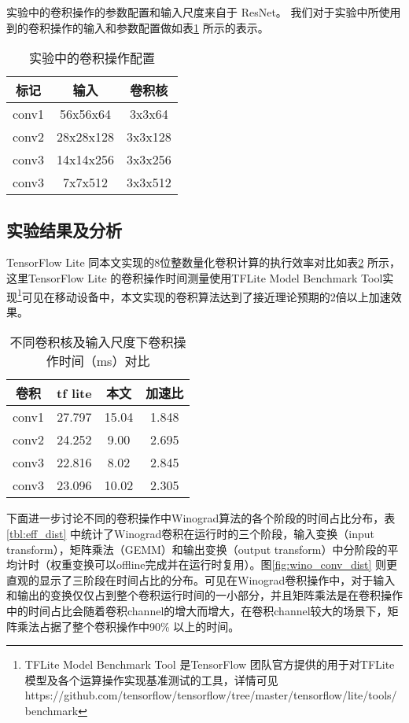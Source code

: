 实验中的卷积操作的参数配置和输入尺度来自于 ResNet\cite{He2016DeepRL}。
我们对于实验中所使用到的卷积操作的输入和参数配置做如表\ref{tbl:conv_repr} 所示的表示。

\begin{table}[]
\centering
\caption{实验中的卷积操作配置}
\begin{tabular}{ccc}
  \toprule
  标记    & 输入     & 卷积核  \\
  \midrule
  conv1   & 56x56x64  & 3x3x64  \\
  conv2   & 28x28x128 & 3x3x128 \\
  conv3   & 14x14x256 & 3x3x256 \\
  conv3   & 7x7x512 & 3x3x512 \\
  \bottomrule
\end{tabular}
\label{tbl:conv_repr}
\end{table}


\subsection{实验结果及分析}

TensorFlow Lite 同本文实现的8位整数量化卷积计算的执行效率对比如表\ref{tbl:eff_tbl} 所示，这里TensorFlow Lite 的卷积操作时间测量使用TFLite Model Benchmark Tool实现\footnote{TFLite Model Benchmark Tool 是TensorFlow 团队官方提供的用于对TFLite模型及各个运算操作实现基准测试的工具，详情可见 https://github.com/tensorflow/tensorflow/tree/master/tensorflow/lite/tools/benchmark}可见在移动设备中，本文实现的卷积算法达到了接近理论预期的2倍以上加速效果。

\begin{table}[]
\centering
\caption{不同卷积核及输入尺度下卷积操作时间（ms）对比}
\begin{tabular}{cccc}
\toprule
卷积 & tf lite & 本文  & 加速比\\
\midrule
conv1  & 27.797  & 15.04  & 1.848 \\
conv2  & 24.252  & 9.00 & 2.695\\
conv3  & 22.816  & 8.02 & 2.845\\
conv3  & 23.096  & 10.02 & 2.305\\
\bottomrule
\end{tabular}
\label{tbl:eff_tbl}
\end{table}

下面进一步讨论不同的卷积操作中Winograd算法的各个阶段的时间占比分布，表\ref{tbl:eff_dist} 中统计了Winograd卷积在运行时的三个阶段，输入变换（input transform），矩阵乘法（GEMM）和输出变换（output transform）中分阶段的平均计时（权重变换可以offline完成并在运行时复用）。图\ref{fig:wino_conv_dist} 则更直观的显示了三阶段在时间占比的分布。可见在Winograd卷积操作中，对于输入和输出的变换仅仅占到整个卷积运行时间的一小部分，并且矩阵乘法是在卷积操作中的时间占比会随着卷积channel的增大而增大，在卷积channel较大的场景下，矩阵乘法占据了整个卷积操作中90\% 以上的时间。


